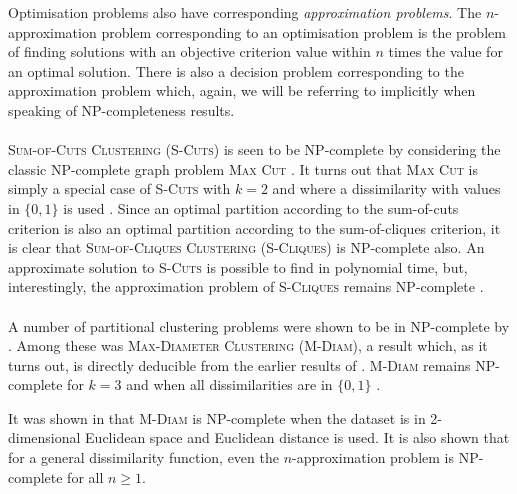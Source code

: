 Optimisation problems also have corresponding \textit{approximation problems}.
The $n$-approximation problem corresponding to an optimisation problem is the
problem of finding solutions with an objective criterion value within $n$
times the value for an optimal solution.  There is also a decision problem
corresponding to the approximation problem which, again, we will be referring
to implicitly when speaking of NP-completeness results.
\\\\
\noindent \textsc{Sum-of-Cuts Clustering} (\textsc{S-Cuts}) is seen to be
NP-complete by considering the classic NP-complete graph problem \textsc{Max
  Cut} \citep{karp72twentyone,gonzalez1982computational}.  It turns out that
\textsc{Max Cut} is simply a special case of \textsc{S-Cuts} with $k=2$ and
where a dissimilarity with values in $\{0,1\}$ is used
\citep{garey76simplified}.  Since an optimal partition according to the
sum-of-cuts criterion is also an optimal partition according to the
sum-of-cliques criterion, it is clear that \textsc{Sum-of-Cliques Clustering}
(\textsc{S-Cliques}) is NP-complete also.  An approximate solution to
\textsc{S-Cuts} is possible to find in polynomial time, but, interestingly,
the approximation problem of \textsc{S-Cliques} remains NP-complete
\citep{sahni1976p}.
\\\\
\noindent A number of partitional clustering problems were shown to be in
NP-complete by \citet{brucker1978complexity}.  Among these was
\textsc{Max-Diameter Clustering} (\textsc{M-Diam}), a result which, as it
turns out, is directly deducible from the earlier results of
\citet{sahni1976p}.  \textsc{M-Diam} remains NP-complete for $k=3$ and when
all dissimilarities are in $\{0,1\}$ \citep{gareyjohnson79}.

It was shown in \citet{gonzalez1985clustering} that \textsc{M-Diam} is
NP-complete when the dataset is in 2-dimensional Euclidean space and Euclidean
distance is used.  It is also shown that for a general dissimilarity function,
even the $n$-approximation problem is NP-complete for all $n\geq 1$.

